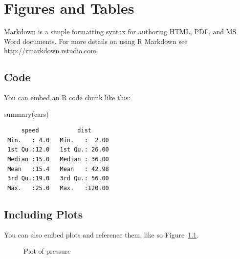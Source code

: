 \documentclass[
  letterpaper,
  oneside,
  open=any]{scrbook}
\newenvironment{Shaded}{\begin{snugshade}}{\end{snugshade}}
\newcommand{\FunctionTok}[1]{\textcolor[rgb]{0.28,0.35,0.67}{#1}}
\newcommand{\NormalTok}[1]{\textcolor[rgb]{0.00,0.23,0.31}{#1}}
\begin{document}

\chapter{Figures and Tables}\label{figures-and-tables}

Markdown is a simple formatting syntax for authoring HTML, PDF, and MS
Word documents. For more details on using R Markdown see
\url{http://rmarkdown.rstudio.com}.

\section{Code}\label{code}

You can embed an R code chunk like this:

\begin{Shaded}
\begin{Highlighting}[]
\FunctionTok{summary}\NormalTok{(cars)}
\end{Highlighting}
\end{Shaded}

\begin{verbatim}
     speed           dist       
 Min.   : 4.0   Min.   :  2.00  
 1st Qu.:12.0   1st Qu.: 26.00  
 Median :15.0   Median : 36.00  
 Mean   :15.4   Mean   : 42.98  
 3rd Qu.:19.0   3rd Qu.: 56.00  
 Max.   :25.0   Max.   :120.00  
\end{verbatim}

\section{Including Plots}\label{including-plots}

You can also embed plots and reference them, like so
Figure~\ref{fig-pressure}.

\begin{figure}


\caption{\label{fig-pressure}Plot of pressure}

\end{figure}%
\end{document}
